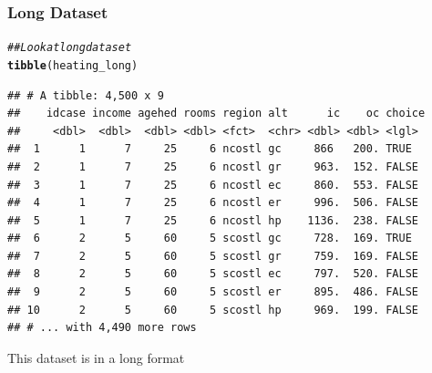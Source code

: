 \documentclass{beamer}\usepackage[]{graphicx}\usepackage[]{color}
\makeatletter
\newcommand{\hlstr}[1]{\textcolor[rgb]{0.192,0.494,0.8}{#1}}%
\newcommand{\hlcom}[1]{\textcolor[rgb]{0.678,0.584,0.686}{\textit{#1}}}%
\newcommand{\hlopt}[1]{\textcolor[rgb]{0,0,0}{#1}}%
\newcommand{\hlstd}[1]{\textcolor[rgb]{0.345,0.345,0.345}{#1}}%
\newcommand{\hlkwb}[1]{\textcolor[rgb]{0.69,0.353,0.396}{#1}}%
\newcommand{\hlkwc}[1]{\textcolor[rgb]{0.333,0.667,0.333}{#1}}%
\newcommand{\hlkwd}[1]{\textcolor[rgb]{0.737,0.353,0.396}{\textbf{#1}}}%
\newenvironment{kframe}{%
 \def\at@end@of@kframe{}%
 \ifinner\ifhmode%
  \def\at@end@of@kframe{\end{minipage}}%
  \begin{minipage}{\columnwidth}%
 \fi\fi%
 \def\FrameCommand##1{\hskip\@totalleftmargin \hskip-\fboxsep
 \colorbox{shadecolor}{##1}\hskip-\fboxsep
     \hskip-\linewidth \hskip-\@totalleftmargin \hskip\columnwidth}%
 \MakeFramed {\advance\hsize-\width
   \@totalleftmargin\z@ \linewidth\hsize
   \@setminipage}}%
 {\par\unskip\endMakeFramed%
 \at@end@of@kframe}
\newenvironment{knitrout}{}{} %
\makeatother
\begin{document}

\begin{frame}[fragile]\frametitle{Long Dataset}
\begin{knitrout}\footnotesize
{}\color{fgcolor}\begin{kframe}
\begin{alltt}
\hlcom{## Look at long dataset}
\hlkwd{tibble}\hlstd{(heating_long)}
\end{alltt}
\begin{verbatim}
## # A tibble: 4,500 x 9
##    idcase income agehed rooms region alt      ic    oc choice
##     <dbl>  <dbl>  <dbl> <dbl> <fct>  <chr> <dbl> <dbl> <lgl> 
##  1      1      7     25     6 ncostl gc     866   200. TRUE  
##  2      1      7     25     6 ncostl gr     963.  152. FALSE 
##  3      1      7     25     6 ncostl ec     860.  553. FALSE 
##  4      1      7     25     6 ncostl er     996.  506. FALSE 
##  5      1      7     25     6 ncostl hp    1136.  238. FALSE 
##  6      2      5     60     5 scostl gc     728.  169. TRUE  
##  7      2      5     60     5 scostl gr     759.  169. FALSE 
##  8      2      5     60     5 scostl ec     797.  520. FALSE 
##  9      2      5     60     5 scostl er     895.  486. FALSE 
## 10      2      5     60     5 scostl hp     969.  199. FALSE 
## # ... with 4,490 more rows
\end{verbatim}
\end{kframe}
\end{knitrout}
    \vspace{2ex}
    This dataset is in a long format
\end{frame}
\end{document}
